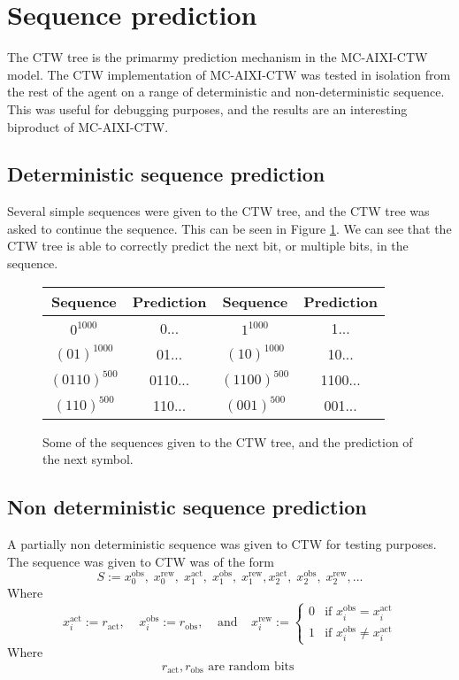 \documentclass[pdftex,twoside,a4paper]{report}
\newcommand{\bcen}{\begin{center}}
\newcommand{\ecen}{\end{center}}
\newcommand{\mac}{MC-AIXI-CTW}
\begin{document}
\section{Sequence prediction}
\label{sec:Sequence prediction}
The CTW tree is the primarmy prediction mechanism in the \mac{} model. The CTW implementation of \mac{} was tested in isolation from the rest of the agent on a range of deterministic and non-deterministic sequence. This was useful for debugging purposes, and the results are an interesting biproduct of \mac{}.
\subsection{Deterministic sequence prediction}
Several simple sequences were given to the CTW tree, and the CTW tree was asked to continue the sequence. This can be seen in Figure \ref{tab:det_seq_pred}. We can see that the CTW tree is able to correctly predict the next bit, or multiple bits, in the sequence.

\begin{figure}
\bcen
\bgroup
\def\arraystretch{1.5}
\begin{tabular}{|cc|cc|}
\hline
Sequence & Prediction & Sequence & Prediction\\
\hline $0^{1000}$ & 0... & $1^{1000}$ & 1...\\ 
\hline $(01)^{1000}$ & 01... & $(10)^{1000}$ & 10...\\ 
\hline $(0110)^{500}$ & 0110... & $(1100)^{500}$ & 1100...\\ 
\hline $(110)^{500}$ & 110... & $(001)^{500}$ & 001...\\
\hline 
\end{tabular} 
\egroup
\ecen
\caption{Some of the sequences given to the CTW tree, and the prediction of the next symbol.}
\label{tab:det_seq_pred}
\end{figure}

\subsection{Non deterministic sequence prediction}
A partially non deterministic sequence was given to CTW for testing purposes. The sequence was given to CTW was of the form\\
\[
S := x^{\text{obs}}_0,\; x^{\text{rew}}_0,\; x^{\text{act}}_1,\; x^{\text{obs}}_1,\; x^{\text{rew}}_1, x^{\text{act}}_2,\; x^{\text{obs}}_2,\; x^{\text{rew}}_2, ...
\]
Where\\
\[
x^{\text{act}}_i := r_{\text{act}}, \;\;\;\; x^{\text{obs}}_i := r_{\text{obs}}, \;\;\;\; \text{and} \;\;\;\;
x^{\text{rew}}_i :=
\begin{cases}
0 & \text{if } x^{\text{obs}}_i = x^{\text{act}}_i\\
1 & \text{if } x^{\text{obs}}_i \not= x^{\text{act}}_i
\end{cases}
\]
Where\\
\[
r_\text{act}, r_\text{obs} \text{ are random bits }
\]
\end{document}

